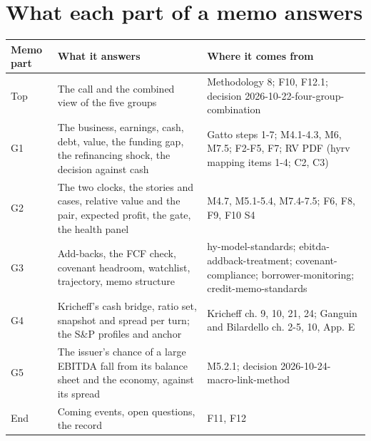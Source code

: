 \documentclass[11pt,a4paper]{article}
\begin{document}
\section*{What each part of a memo answers}
\begin{center}\footnotesize\begin{tabular}{@{}lp{7.2cm}p{6.4cm}@{}}\toprule Memo part & What it answers & Where it comes from \\\midrule
Top & The call and the combined view of the five groups & Methodology 8; F10, F12.1; decision 2026-10-22-four-group-combination \\
G1 & The business, earnings, cash, debt, value, the funding gap, the refinancing shock, the decision against cash & Gatto steps 1-7; M4.1-4.3, M6, M7.5; F2-F5, F7; RV PDF (hyrv mapping items 1-4; C2, C3) \\
G2 & The two clocks, the stories and cases, relative value and the pair, expected profit, the gate, the health panel & M4.7, M5.1-5.4, M7.4-7.5; F6, F8, F9, F10 S4 \\
G3 & Add-backs, the FCF check, covenant headroom, watchlist, trajectory, memo structure & hy-model-standards; ebitda-addback-treatment; covenant-compliance; borrower-monitoring; credit-memo-standards \\
G4 & Kricheff's cash bridge, ratio set, snapshot and spread per turn; the S\&P profiles and anchor & Kricheff ch. 9, 10, 21, 24; Ganguin and Bilardello ch. 2-5, 10, App. E \\
G5 & The issuer's chance of a large EBITDA fall from its balance sheet and the economy, against its spread & M5.2.1; decision 2026-10-24-macro-link-method \\
End & Coming events, open questions, the record & F11, F12 \\
\bottomrule\end{tabular}\end{center}
\end{document}
